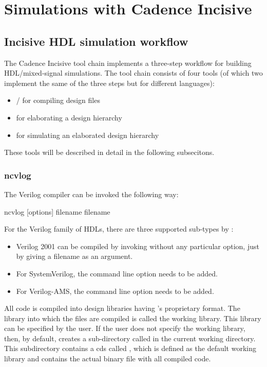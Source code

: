\chapter{Simulations with Cadence Incisive}
\label{chap:incisive}
\section{Incisive HDL simulation workflow}
The Cadence Incisive tool chain implements a three-step workflow for building
\gls{HDL}/mixed-signal simulations. The tool chain consists of four tools (of
which two implement the same of the three steps but for different languages):
\begin{itemize}
	\item {}/ for compiling design files
	\item {} for elaborating a design hierarchy
	\item {} for simulating an elaborated design hierarchy
\end{itemize}

These tools will be described in detail in the following subsecitons.

\subsection{ncvlog}
The Verilog compiler  can be invoked the following way:
\begin{lstbashplain}
 ncvlog [options] filename { filename }
\end{lstbashplain}
For the Verilog family of \glspl{HDL}, there are three supported sub-types by
:
\begin{itemize}
	\item Verilog 2001 can be compiled by invoking  without any
		particular option, just by giving a filename as an argument.
	\item For SystemVerilog, the command line option  needs to be
		added.
	\item For Verilog-AMS, the command line option  needs to be
		added.
\end{itemize}

All code is compiled into design libraries having 's proprietary
format. The library into which the files are compiled is called the working
library. This library can be specified by the user. If the user does not
specify the working library, then, by default,  creates a
sub-directory called  in the current working directory. This
subdirectory contains a \gls{cds} called , which is defined as the
default working library and contains the actual binary file with all compiled
code.

